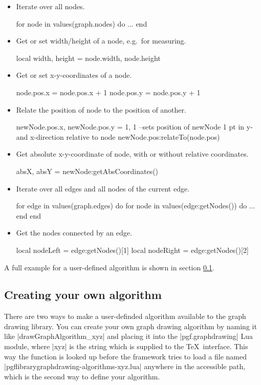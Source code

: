 \begin{itemize}
\item Iterate over all nodes.
\begin{codeexample}
for node in values(graph.nodes) do
   ...
end
\end{codeexample}
\item Get or set width/height of a node, e.g.\ for measuring.
\begin{codeexample}
local width, height = node.width, node.height
\end{codeexample}
\item Get or set x-y-coordinates of a node.
\begin{codeexample}
node.pos.x = node.pos.x + 1
node.pos.y = node.pos.y + 1
\end{codeexample}
\item Relate the position of node to the position of another.
\begin{codeexample}
newNode.pos.x, newNode.pos.y = 1, 1
--sets position of newNode 1 pt in y- and x-direction relative to node
newNode.pos:relateTo(node.pos)
\end{codeexample}
\item Get absolute x-y-coordinate of node, with or without relative coordinates.
\begin{codeexample}
absX, absY = newNode:getAbsCoordinates()
\end{codeexample}
\item Iterate over all edges and all nodes of the current edge.
\begin{codeexample}
for edge in values(graph.edges) do
   for node in values(edge:getNodes()) do
      ...
   end
end
\end{codeexample}
\item Get the nodes connected by an edge.
\begin{codeexample}
local nodeLeft = edge:getNodes()[1]
local nodeRight = edge:getNodes()[2]
\end{codeexample}
\end{itemize}

A full example for a user-defined algorithm is shown in section \ref{section-library-graphdrawing-ownAlgorithm}.

\subsection{Creating your own algorithm}
\label{section-library-graphdrawing-ownAlgorithm}
There are two ways to make a user-definded algorithm
available to the graph drawing library.
You can create your own graph drawing algorithm by naming it like
|drawGraphAlgorithm_xyz| and placing it into the |pgf.graphdrawing|
Lua module, where |xyz| is the string which is supplied to the
\TeX\ interface.  This way the function is looked up before the
framework tries to load a file named
|pgflibrarygraphdrawing-algorithms-xyz.lua| anywhere in the accessible
path, which is the second way to define your algorithm.

